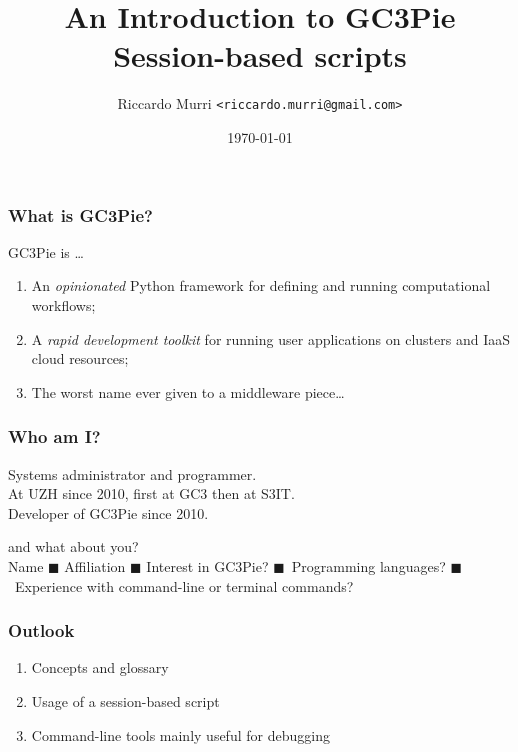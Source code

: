 \documentclass[english,serif,mathserif,usenames,dvipsnames]{beamer}
\begin{document}
\title[GC3Pie Tools]{An Introduction to GC3Pie Session-based scripts}
\author{Riccardo Murri \texttt{<riccardo.murri@gmail.com>}}
\date{\today}

\maketitle

%

\begin{frame}
  \frametitle{What is GC3Pie?}
  GC3Pie is \ldots
  \begin{enumerate}
  \item An \emph{opinionated} Python framework for defining and running computational workflows;
  \item \alert<2>{A \emph{rapid development toolkit} for running user applications on clusters and IaaS cloud resources;}
  \item The worst name ever given to a middleware piece\ldots
  \end{enumerate}

  \+
\end{frame}


\begin{frame}
  \frametitle{Who am I?}
  \begin{center}
    Systems administrator and programmer.
    \\ \+
    At UZH since 2010, first at GC3 then at S3IT.
    \\ \+
    Developer of GC3Pie since 2010.
  \end{center}
\end{frame}


\begin{frame}
  \begin{center}
    {\Huge and what about you?}
    \\ \+ \+
    \small
    Name $\blacksquare$ Affiliation $\blacksquare$ Interest in GC3Pie?
    $\blacksquare$~Programming languages?
    $\blacksquare$~Experience with command-line or terminal commands?
  \end{center}
\end{frame}


\begin{frame}
  \frametitle{Outlook}
  \begin{enumerate}
  \item Concepts and glossary
  \item Usage of a session-based script
  \item Command-line tools mainly useful for debugging
  \end{enumerate}
\end{frame}
\end{document}
